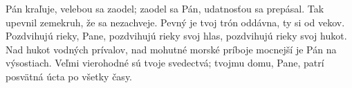 Pán kraľuje, velebou sa zaodel;
zaodel sa Pán, udatnosťou sa prepásal.
\versseparator
Tak upevnil zemekruh, že sa nezachveje.
\versseparator
Pevný je tvoj trón oddávna,
ty si od vekov.
\versseparator
Pozdvihujú rieky, Pane,
pozdvihujú rieky svoj hlas,
\versseparator
pozdvihujú rieky svoj hukot.
Nad hukot vodných prívalov,
\versseparator
nad mohutné morské príboje
mocnejší je Pán na výsostiach.
\versseparator
Veľmi vierohodné sú tvoje svedectvá;
tvojmu domu, Pane, patrí posvätná úcta po všetky časy.